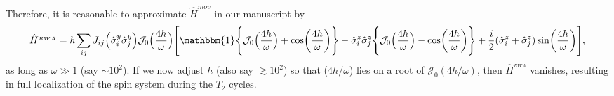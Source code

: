 \documentclass[aps,prb,reprint,showpacs,floatfix,superscriptaddress, onecolumn, nofootinbib, 9pt]{revtex4-2}
\begin{document}
\begin{enumerate}
{Therefore, it is reasonable to approximate   $\hat{H}^{mov}$ in our manuscript by 
\begin{align}
	\hat{H}^{_{RWA}} = \hbar\sum_{ij} J_{ij} \Big(\hat{\sigma}^y_i\hat{\sigma}^y_j\Big) \mathcal{J}_0\Big(\frac{4h}{\omega}\Big)\Bigg[\mathbbm{1}\Bigg\{\mathcal{J}_0\Big(\frac{4h}{\omega}\Big) + \cos(\frac{4h}{\omega})\Bigg\} -\hat{\sigma}^z_i\hat{\sigma}^z_j \Bigg\{\mathcal{J}_0\Big(\frac{4h}{\omega}\Big) - \cos(\frac{4h}{\omega})\Bigg\} + \frac{i}{2} (\hat{\sigma}^z_i + \hat{\sigma}^z_j) \sin(\frac{4h}{\omega})\Bigg],
\end{align}
as long as $\omega\gg 1$ (say $\sim 10^2$). If we now adjust $h$ (also say $\gtrsim 10^2$) so that ($4h/\omega$) lies on a root of $\mathcal{J}_0(4h/\omega)$, then $\hat{H}^{_{RWA}}$ vanishes, resulting in full localization of the spin system during the $T_2$ cycles.

}
\end{enumerate}
\end{document}
